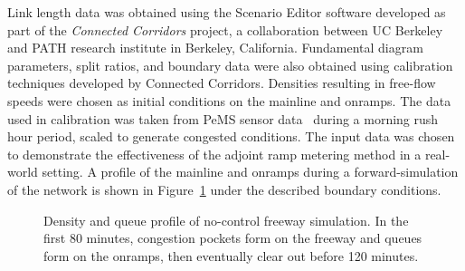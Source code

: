 								
				Link length data was obtained using the Scenario Editor software developed
				as part of the \textit{Connected Corridors} project, a collaboration between
				UC Berkeley and PATH research institute in Berkeley, California.
				Fundamental diagram parameters, split ratios, and boundary data were
				also obtained using calibration techniques developed by Connected
				Corridors. Densities resulting in free-flow speeds were chosen as
				initial conditions on the mainline and onramps. The data used in calibration
				was taken from PeMS sensor data~\cite{Chen2003} during a morning rush hour period,
				scaled to generate congested conditions. The input data was chosen
				to demonstrate the effectiveness of the adjoint ramp metering method
				in a real-world setting. A profile of the mainline and onramps during
				a forward-simulation of the network is shown in Figure~\ref{fig:Density-and-queue}
				under the described boundary conditions.
				\begin{figure}[b]
					\hfill{}
																
								\caption{Density and queue profile of no-control freeway simulation. In the
									first 80 minutes, congestion pockets form on the freeway and queues
									form on the onramps, then eventually clear out before 120 minutes.\label{fig:Density-and-queue}}
							\end{figure}
														
